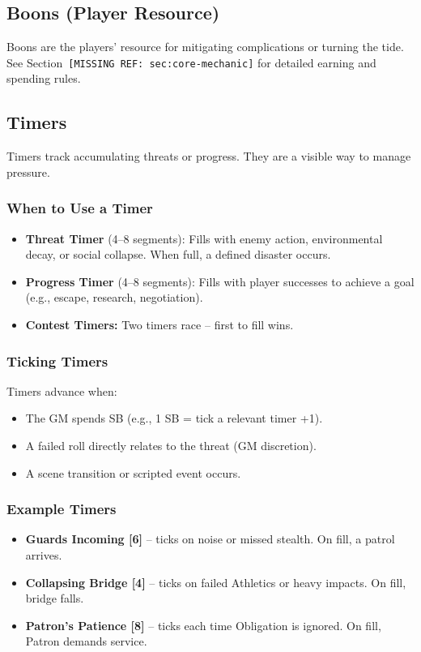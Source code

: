 \subsection{Boons (Player Resource)}

Boons are the players' resource for mitigating complications or turning the tide. See Section~\texttt{[MISSING REF: sec:core-mechanic]} for detailed earning and spending rules.

\subsection{Timers}

Timers track accumulating threats or progress. They are a visible way to manage pressure.

\subsubsection{When to Use a Timer }
\begin{itemize}
  \item \textbf{Threat Timer } (4--8 segments): Fills with enemy action, environmental decay, or social collapse. When full, a defined disaster occurs.
  \item \textbf{Progress Timer } (4--8 segments): Fills with player successes to achieve a goal (e.g., escape, research, negotiation).
  \item \textbf{Contest Timers:} Two timers race -- first to fill wins.
\end{itemize}

\subsubsection{Ticking Timers}
Timers advance when:
\begin{itemize}
  \item The GM spends SB (e.g., 1 SB = tick a relevant timer +1).
  \item A failed roll directly relates to the threat (GM discretion).
  \item A scene transition or scripted event occurs.
\end{itemize}

\subsubsection{Example Timers}
\begin{itemize}
  \item \textbf{Guards Incoming [6]} -- ticks on noise or missed stealth. On fill, a patrol arrives.
  \item \textbf{Collapsing Bridge [4]} -- ticks on failed Athletics or heavy impacts. On fill, bridge falls.
  \item \textbf{Patron's Patience [8]} -- ticks each time Obligation is ignored. On fill, Patron demands service.
\end{itemize}

